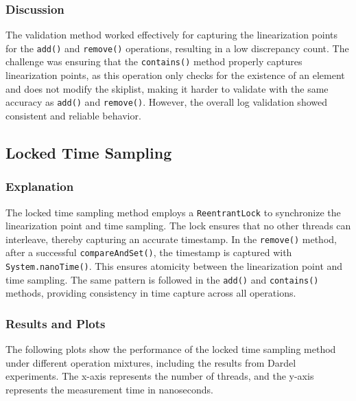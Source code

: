 \documentclass{article}
\begin{document}
\subsubsection{Discussion}
The validation method worked effectively for capturing the linearization points for the \texttt{add()} and \texttt{remove()} operations, resulting in a low discrepancy count. The challenge was ensuring that the \texttt{contains()} method properly captures linearization points, as this operation only checks for the existence of an element and does not modify the skiplist, making it harder to validate with the same accuracy as \texttt{add()} and \texttt{remove()}. However, the overall log validation showed consistent and reliable behavior.

\newpage
\subsection{Locked Time Sampling}

\subsubsection{Explanation}
The locked time sampling method employs a \texttt{ReentrantLock} to synchronize the linearization point and time sampling. The lock ensures that no other threads can interleave, thereby capturing an accurate timestamp. In the \texttt{remove()} method, after a successful \texttt{compareAndSet()}, the timestamp is captured with \texttt{System.nanoTime()}. This ensures atomicity between the linearization point and time sampling. The same pattern is followed in the \texttt{add()} and \texttt{contains()} methods, providing consistency in time capture across all operations.

\subsubsection{Results and Plots}

The following plots show the performance of the locked time sampling method under different operation mixtures, including the results from Dardel experiments. The x-axis represents the number of threads, and the y-axis represents the measurement time in nanoseconds.
\end{document}
